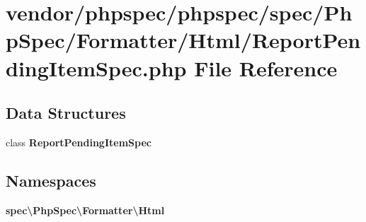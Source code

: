 \section{vendor/phpspec/phpspec/spec/\+Php\+Spec/\+Formatter/\+Html/\+Report\+Pending\+Item\+Spec.php File Reference}
\label{_report_pending_item_spec_8php}
\subsection*{Data Structures}
\begin{DoxyCompactItemize}
\item 
class {\bf Report\+Pending\+Item\+Spec}
\end{DoxyCompactItemize}
\subsection*{Namespaces}
\begin{DoxyCompactItemize}
\item 
 {\bf spec\textbackslash{}\+Php\+Spec\textbackslash{}\+Formatter\textbackslash{}\+Html}
\end{DoxyCompactItemize}
